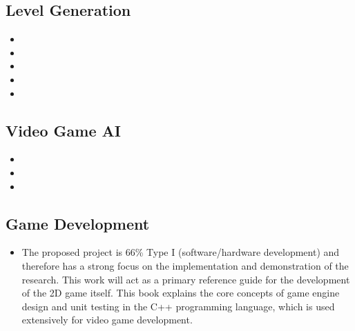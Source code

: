 \documentclass[a4paper]{article}
\begin{document}
\subsection{Level Generation}
\begin{itemize}
  \item {} \vspace{-2.5mm}
  \item {} \vspace{-2.5mm}
  \item {} \vspace{-2.5mm}
  \item {} \vspace{-2.5mm}
  \item {} \vspace{-2.5mm}
\end{itemize}

\subsection{Video Game AI}
\begin{itemize}
  \item {} \vspace{-2.5mm}
  \item {} \vspace{-2.5mm}
  \item {} \vspace{-2.5mm}
\end{itemize}

\subsection{Game Development}
\begin{itemize}
  \item {}
    \par \noindent The proposed project is 66\% Type I (software/hardware development) and therefore has a strong focus on the implementation and demonstration of the research. This work will act as a primary reference guide for the development of the 2D game itself. This book explains the core concepts of game engine design and unit testing in the C++ programming language, which is used extensively for video game development.
\end{itemize}
\vspace{-5mm}
\end{document}
